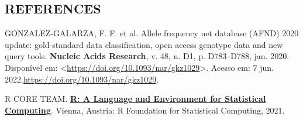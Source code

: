 \documentclass[
]{article}
\newlength{\cslhangindent}
\newlength{\cslentryspacingunit} %
\newenvironment{CSLReferences}[2] %
 {%
  \setlength{\parindent}{0pt}
  \ifodd #1
  \let\oldpar\par
  \def\par{\hangindent=\cslhangindent\oldpar}
  \fi
  \setlength{\parskip}{#2\cslentryspacingunit}
 }%
 {}
\begin{document}
\hypertarget{references}{%
\subsection{REFERENCES}\label{references}}

\hypertarget{refs}{}
\begin{CSLReferences}{0}{0}
\leavevmode{}%
GONZALEZ-GALARZA, F. F. et al. Allele frequency net database ({AFND}) 2020 update: gold-standard data classification, open access genotype data and new query tools. \textbf{Nucleic Acids Research}, v. 48, n. D1, p. D783--D788, jan. 2020. Disponível em: \textless{}\url{https://doi.org/10.1093/nar/gkz1029}\textgreater. Acesso em: 7 jun. 2022.\url{https://doi.org/10.1093/nar/gkz1029}.

\leavevmode{}%
R CORE TEAM. \textbf{\href{https://www.R-project.org/}{R: A Language and Environment for Statistical Computing}}. Vienna, Austria: R Foundation for Statistical Computing, 2021.

\end{CSLReferences}
\end{document}
